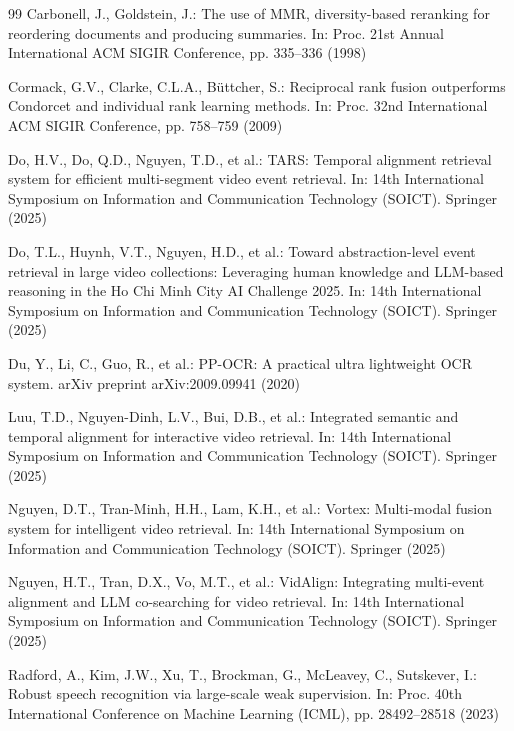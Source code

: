 \documentclass[runningheads]{llncs}
\begin{document}
\begin{thebibliography}{99}
Carbonell, J., Goldstein, J.: The use of MMR, diversity-based reranking for reordering documents and producing summaries. In: Proc. 21st Annual International ACM SIGIR Conference, pp. 335--336 (1998)

Cormack, G.V., Clarke, C.L.A., B\"uttcher, S.: Reciprocal rank fusion outperforms Condorcet and individual rank learning methods. In: Proc. 32nd International ACM SIGIR Conference, pp. 758--759 (2009)

Do, H.V., Do, Q.D., Nguyen, T.D., et al.: TARS: Temporal alignment retrieval system for efficient multi-segment video event retrieval. In: 14th International Symposium on Information and Communication Technology (SOICT). Springer (2025)

Do, T.L., Huynh, V.T., Nguyen, H.D., et al.: Toward abstraction-level event retrieval in large video collections: Leveraging human knowledge and LLM-based reasoning in the Ho Chi Minh City AI Challenge 2025. In: 14th International Symposium on Information and Communication Technology (SOICT). Springer (2025)

Du, Y., Li, C., Guo, R., et al.: PP-OCR: A practical ultra lightweight OCR system. arXiv preprint arXiv:2009.09941 (2020)

Luu, T.D., Nguyen-Dinh, L.V., Bui, D.B., et al.: Integrated semantic and temporal alignment for interactive video retrieval. In: 14th International Symposium on Information and Communication Technology (SOICT). Springer (2025)

Nguyen, D.T., Tran-Minh, H.H., Lam, K.H., et al.: Vortex: Multi-modal fusion system for intelligent video retrieval. In: 14th International Symposium on Information and Communication Technology (SOICT). Springer (2025)

Nguyen, H.T., Tran, D.X., Vo, M.T., et al.: VidAlign: Integrating multi-event alignment and LLM co-searching for video retrieval. In: 14th International Symposium on Information and Communication Technology (SOICT). Springer (2025)

Radford, A., Kim, J.W., Xu, T., Brockman, G., McLeavey, C., Sutskever, I.: Robust speech recognition via large-scale weak supervision. In: Proc. 40th International Conference on Machine Learning (ICML), pp. 28492--28518 (2023)


\end{thebibliography}
\end{document}
